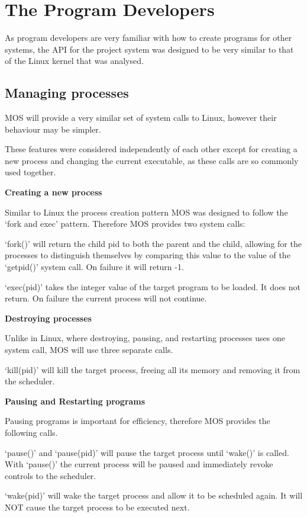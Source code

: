 \documentclass[a4paper]{report}
\begin{document}
\section{The Program Developers}

As program developers are very familiar with how to create programs for other systems, the API for the project system was designed to be very similar to that of the Linux kernel that was analysed.

\subsection{Managing processes}

MOS will provide a very similar set of system calls to Linux, however their behaviour may be simpler.

These features were considered independently of each other except for creating a new process and changing the current executable, as these calls are so commonly used together.

\textbf{Creating a new process}

Similar to Linux the process creation pattern MOS was designed to follow the `fork and exec' pattern. Therefore MOS provides two system calls:

`fork()' will return the child pid to both the parent and the child, allowing for the processes to distinguish themselves by comparing this value to the value of the `get\textunderscore pid()' system call. On failure it will return -1.

`exec(pid)' takes the integer value of the target program to be loaded. It does not return. On failure the current process will not continue.

\textbf{Destroying processes}

Unlike in Linux, where destroying, pausing, and restarting processes uses one system call, MOS will use three separate calls.

`kill(pid)' will kill the target process, freeing all its memory and removing it from the scheduler.

\textbf{Pausing and Restarting programs}

Pausing programs is important for efficiency, therefore MOS provides the following calls.

`pause()' and `pause(pid)' will pause the target process until `wake()' is called. With `pause()' the current process will be paused and immediately revoke controls to the scheduler.

`wake(pid)' will wake the target process and allow it to be scheduled again. It will NOT cause the target process to be executed next.
\end{document}

